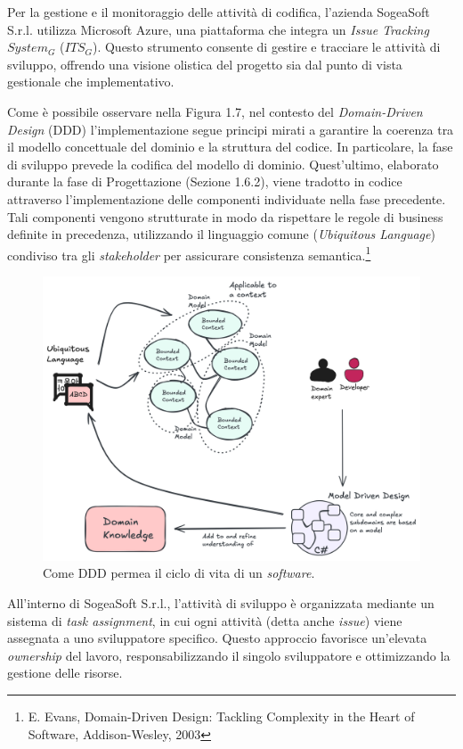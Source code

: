         \noindent Per la gestione e il monitoraggio delle attività di codifica, l'azienda SogeaSoft S.r.l. utilizza Microsoft Azure, una piattaforma che integra un \textit{Issue Tracking $System_G$} ($ITS_G$). Questo strumento consente di gestire e tracciare le attività di sviluppo, offrendo una visione olistica del progetto sia dal punto di vista gestionale che implementativo.

        \noindent Come è possibile osservare nella Figura 1.7, nel contesto del \textit{Domain-Driven Design} (DDD) l’implementazione segue principi mirati a garantire la coerenza tra il modello concettuale del dominio e la struttura del codice. In particolare, la fase di sviluppo prevede la codifica del modello di dominio.
        Quest'ultimo, elaborato durante la fase di Progettazione (Sezione 1.6.2), viene tradotto in codice attraverso l'implementazione delle componenti individuate nella fase precedente. Tali componenti vengono strutturate in modo da rispettare le regole di business definite in precedenza, utilizzando il linguaggio comune (\textit{Ubiquitous Language}) condiviso tra gli \textit{stakeholder} per assicurare consistenza semantica.\footnote{E. Evans, Domain-Driven Design: Tackling Complexity in the Heart of Software, Addison-Wesley, 2003}

        \begin{figure}[H]
            \centering
            \includegraphics[width=0.8\linewidth]{BCS-Tessi//images/DDD_CicloSoftware.png}
            \caption[Come DDD permea il ciclo di vita del \textit{software}]{Come DDD permea il ciclo di vita di un \textit{software}.}
            \label{fig:DDD-generale}
        \end{figure}
        
        
        \noindent All'interno di SogeaSoft S.r.l., l'attività di sviluppo è organizzata mediante un sistema di \textit{task assignment}, in cui ogni attività (detta anche \textit{issue}) viene assegnata a uno sviluppatore specifico. Questo approccio favorisce un’elevata \textit{ownership} del lavoro, responsabilizzando il singolo sviluppatore e ottimizzando la gestione delle risorse.

